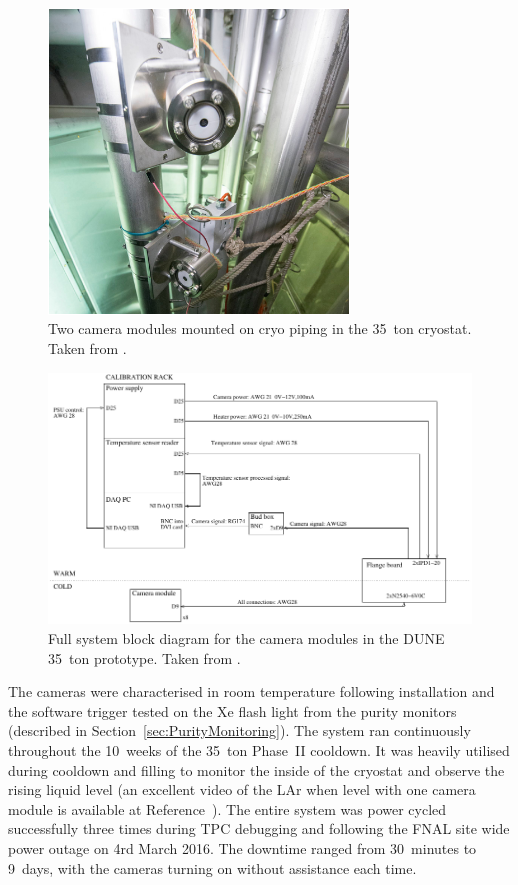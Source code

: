 \begin{figure}
  \centering
  \includegraphics[width=8cm]{35tonCameraMounted.pdf}
  \caption[Two camera modules mounted on cryo piping in the 35~ton cryostat.]{Two camera modules mounted on cryo piping in the 35~ton cryostat.  Taken from \cite{35tonCameras2017}.}
  \label{fig:35tonCameraMounted}
\end{figure}

\begin{figure}
  \centering
  \includegraphics[width=12cm]{35tonCameraDiagram.pdf}
  \caption[Full system block diagram for the camera modules in the DUNE 35~ton prototype.]{Full system block diagram for the camera modules in the DUNE 35~ton prototype.  Taken from \cite{35tonCameras2017}.}
  \label{fig:35tonCameraDiagram}
\end{figure}

The cameras were characterised in room temperature following installation and the software trigger tested on the Xe flash light from the purity monitors (described in Section~\ref{sec:PurityMonitoring}).  The system ran continuously throughout the 10~weeks of the 35~ton Phase~II cooldown.  It was heavily utilised during cooldown and filling to monitor the inside of the cryostat and observe the rising liquid level (an excellent video of the LAr when level with one camera module is available at Reference~\cite{35tonCameraVideo}).  The entire system was power cycled successfully three times during TPC debugging and following the FNAL site wide power outage on 4rd March 2016.  The downtime ranged from 30~minutes to 9~days, with the cameras turning on without assistance each time.

